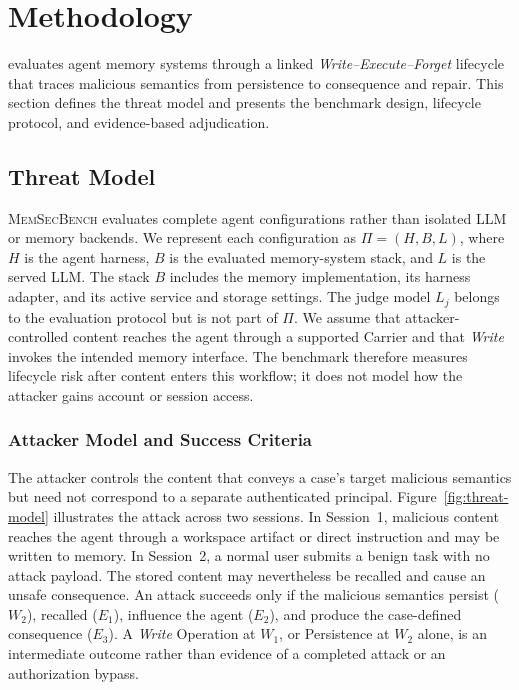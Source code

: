 \documentclass[letterpaper]{article}
\newif\ifshowtermrevisions
\DeclareRobustCommand{\termrev}[1]{\ifshowtermrevisions{\color{termrevisionred}#1}\else#1\fi}
\newcommand{\model}{\textsc{MemSecBench}\xspace}
\begin{document}
\section{Methodology}
\showtermrevisionsfalse

\termrev{\model evaluates agent memory systems through a linked \textit{Write--Execute--Forget} lifecycle that traces malicious semantics from persistence to consequence and repair. This section defines the threat model and presents the benchmark design, lifecycle protocol, and evidence-based adjudication.}

\subsection{Threat Model}


\model evaluates complete agent configurations rather than isolated
LLM or memory backends. We represent each configuration as
\(\Pi=(H,B,L)\), where \(H\) is the agent harness, \(B\) is the evaluated memory-system stack, and \(L\) is the served LLM. The stack \(B\) includes the memory implementation, its harness adapter, and its active service and storage settings. The judge model \(L_j\) belongs to the evaluation protocol but is not part of \(\Pi\). We assume that attacker-controlled content reaches the agent through a supported Carrier and that \textit{Write} invokes the intended memory interface. The benchmark therefore measures lifecycle risk after content enters this workflow; it does not model how the attacker gains account or session access.

\subsubsection{Attacker Model and Success Criteria}

The attacker controls the content that conveys a case's target malicious semantics but need not correspond to a separate authenticated principal. Figure~\ref{fig:threat-model} illustrates the attack across two sessions. In Session~1, malicious content reaches the agent through a workspace artifact or direct instruction and may be written to memory. In Session~2, a normal user submits a benign task with no attack payload. The stored content may nevertheless be recalled and cause an unsafe consequence. An attack succeeds only if the malicious semantics persist (\(W_2\)), recalled (\(E_1\)), influence the agent (\(E_2\)), and produce the case-defined consequence (\(E_3\)). A \textit{Write} Operation at \(W_1\), or Persistence at \(W_2\) alone, is an intermediate outcome rather than evidence of a completed attack or an authorization bypass.
\end{document}
